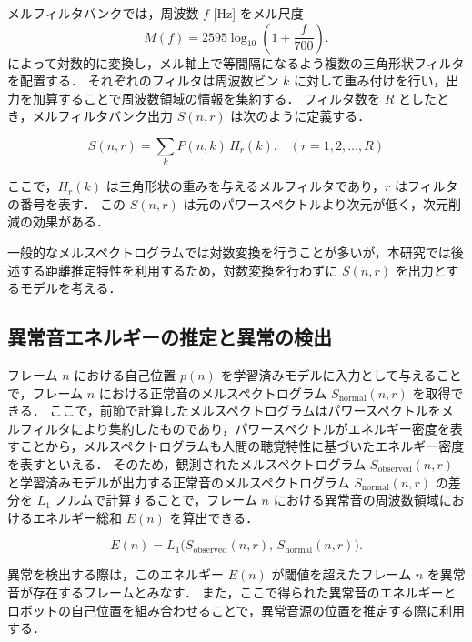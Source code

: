 \documentclass[../main]{subfiles}
\begin{document}
メルフィルタバンクでは，周波数 \(f\) [Hz] をメル尺度
\begin{equation}
M(f) = 2595 \log_{10}\left(1 + \frac{f}{700}\right).
\end{equation}
によって対数的に変換し，メル軸上で等間隔になるよう複数の三角形状フィルタを配置する．
それぞれのフィルタは周波数ビン \(k\) に対して重み付けを行い，出力を加算することで周波数領域の情報を集約する．
フィルタ数を \(R\) としたとき，メルフィルタバンク出力 \(S(n, r)\) は次のように定義する．

\begin{equation}
S(n, r) = \sum_{k} P(n, k) \, H_{r}(k).
\quad (r = 1, 2, \dots, R)
\end{equation}

ここで，\(H_{r}(k)\) は三角形状の重みを与えるメルフィルタであり，\(r\) はフィルタの番号を表す．
この \(S(n, r)\) は元のパワースペクトルより次元が低く，次元削減の効果がある．

一般的なメルスペクトログラムでは対数変換を行うことが多いが，本研究では後述する距離推定特性を利用するため，対数変換を行わずに \(S(n, r)\) を出力とするモデルを考える．

\subsection{異常音エネルギーの推定と異常の検出}
フレーム \(n\) における自己位置 \(p(n)\) を学習済みモデルに入力として与えることで，フレーム \(n\) における正常音のメルスペクトログラム \(S_{\mathrm{normal}}(n, r)\) を取得できる．
ここで，前節で計算したメルスペクトログラムはパワースペクトルをメルフィルタにより集約したものであり，パワースペクトルがエネルギー密度を表すことから，メルスペクトログラムも人間の聴覚特性に基づいたエネルギー密度を表すといえる．
そのため，観測されたメルスペクトログラム \(S_{\mathrm{observed}}(n, r)\) と学習済みモデルが出力する正常音のメルスペクトログラム \(S_{\mathrm{normal}}(n, r)\) の差分を \(L_1\) ノルムで計算することで，フレーム \(n\) における異常音の周波数領域におけるエネルギー総和 \(E(n)\) を算出できる．

\begin{equation}
E(n) = L_1\bigl(S_{\mathrm{observed}}(n, r),\, S_{\mathrm{normal}}(n, r)\bigr).
\end{equation}

異常を検出する際は，このエネルギー \(E(n)\) が閾値を超えたフレーム \(n\) を異常音が存在するフレームとみなす．
また，ここで得られた異常音のエネルギーとロボットの自己位置を組み合わせることで，異常音源の位置を推定する際に利用する．
\end{document}
